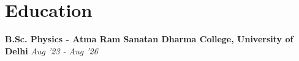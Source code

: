 \documentclass[10pt,letterpaper]{article}
\newcommand{\entryheader}[3]{%
    \textbf{#1} \hfill \textit{#2}\\[0pt]
    \textit{\small #3}\\[1pt]
}
\begin{document}
\section*{Education}
\entryheader{B.Sc. Physics - Atma Ram Sanatan Dharma College, University of Delhi}{Aug '23 - Aug '26}{}

%
%
%
%
%
%
\end{document}
